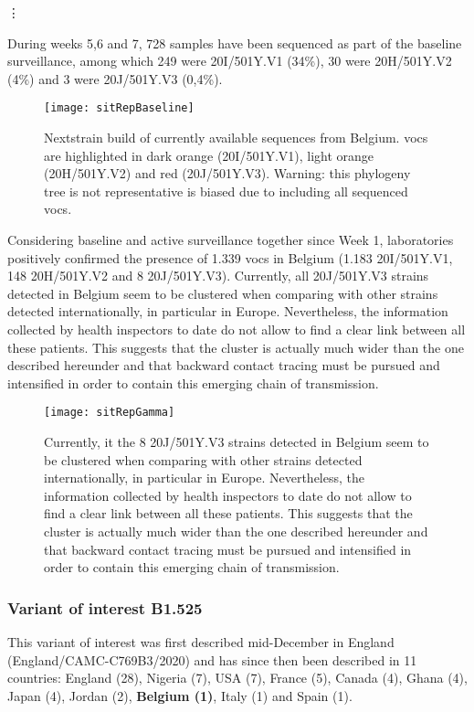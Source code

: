 \vdots

During weeks 5,6 and 7, 728 samples have been sequenced as part of the baseline surveillance, among which 249 were 20I/501Y.V1 (34\%), 30 were 20H/501Y.V2 (4\%) and 3 were 20J/501Y.V3 (0,4\%).

\begin{figure}[ht]
  \centering
  \texttt{[image: sitRepBaseline]}
  \caption[Baseline surveillance VOC phylogeny]{Nextstrain build of currently available sequences from Belgium. \gls{voc}s are highlighted in dark orange (20I/501Y.V1), light orange (20H/501Y.V2) and red (20J/501Y.V3). Warning: this phylogeny tree is not representative is biased due to including all sequenced \gls{voc}s.}
  \label{fig:sitRepBaseline}
\end{figure}

Considering baseline and active surveillance together since Week 1, laboratories positively confirmed the presence of 1.339 \gls{voc}s in Belgium (1.183 20I/501Y.V1, 148 20H/501Y.V2 and 8 20J/501Y.V3).
Currently, all 20J/501Y.V3 strains detected in Belgium seem to be clustered when comparing with other strains detected internationally, in particular in Europe.
Nevertheless, the information collected by health inspectors to date do not allow to find a clear link between all these patients.
This suggests that the cluster is actually much wider than the one described hereunder and that backward contact tracing must be pursued and intensified in order to contain this emerging chain of transmission.

\begin{figure}[ht]
  \centering
  \texttt{[image: sitRepGamma]}
  \caption[20J/501Y.V3 monitoring]{Currently, it the 8 20J/501Y.V3 strains detected in Belgium seem to be clustered when comparing with other strains detected internationally, in particular in Europe. Nevertheless, the information collected by health inspectors to date do not allow to find a clear link between all these patients. This suggests that the cluster is actually much wider than the one described hereunder and that backward contact tracing must be pursued and intensified in order to contain this emerging chain of transmission.}
  \label{fig:sitRepGamma}
\end{figure}

\subsubsection{Variant of interest B1.525}
This variant of interest was first described mid-December in England (England/CAMC-C769B3/2020) and has since then been described in 11 countries: England (28), Nigeria (7), USA (7), France (5), Canada (4), Ghana (4), Japan (4), Jordan (2), \textbf{Belgium (1)}, Italy (1) and Spain (1).

